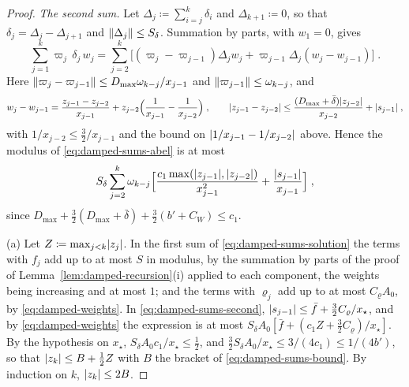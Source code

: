 \documentclass[11pt]{preprint}
\DeclarePairedDelimiter{\abs}{\lvert}{\rvert}
\DeclarePairedDelimiter{\norm}{\lVert}{\rVert}
\numberwithin{equation}{section}
\theoremstyle{definition}
\theoremstyle{remark}
\theoremstyle{plain}
\begin{document}
\begin{proof}
\emph{The second sum.} Let $\Delta_j \coloneqq \sum_{i=j}^{k}\delta_i$ and $\Delta_{k+1} \coloneqq 0$, so that $\delta_j = \Delta_j - \Delta_{j+1}$ and $\norm{\Delta_j} \leq S_\delta$. Summation by parts, with $w_1 = 0$, gives
\begin{equation}\label{eq:damped-sums-abel}
    \sum_{j=1}^{k}\varpi_j\,\delta_j\,w_j = \sum_{j=2}^{k}\bigl[(\varpi_j - \varpi_{j-1})\Delta_jw_j + \varpi_{j-1}\Delta_j(w_j - w_{j-1})\bigr]\;.
\end{equation}
Here $\norm{\varpi_j - \varpi_{j-1}} \leq D_{\max}\omega_{k-j}/x_{j-1}$ and $\norm{\varpi_{j-1}} \leq \omega_{k-j}$, and
\begin{equation}\label{eq:damped-sums-increment}
    w_j - w_{j-1} = \frac{z_{j-1} - z_{j-2}}{x_{j-1}} + z_{j-2}\Bigl(\frac{1}{x_{j-1}} - \frac{1}{x_{j-2}}\Bigr)\;,
    \qquad
    \abs{z_{j-1} - z_{j-2}} \leq \frac{(D_{\max} + \bar\delta)\abs{z_{j-2}}}{x_{j-2}} + \abs{s_{j-1}}\;,
\end{equation}
with $1/x_{j-2} \leq \frac32/x_{j-1}$ and the bound on $\abs{1/x_{j-1} - 1/x_{j-2}}$ above. Hence the modulus of \eqref{eq:damped-sums-abel} is at most
\begin{equation}\label{eq:damped-sums-second}
    S_\delta\sum_{j=2}^{k}\omega_{k-j}\Bigl[\frac{c_1\max(\abs{z_{j-1}}, \abs{z_{j-2}})}{x_{j-1}^2} + \frac{\abs{s_{j-1}}}{x_{j-1}}\Bigr]\;,
\end{equation}
since $D_{\max} + \frac32(D_{\max} + \bar\delta) + \frac32(b' + C_W) \leq c_1$.

(a) Let $Z \coloneqq \max_{j<k}\abs{z_j}$. In the first sum of \eqref{eq:damped-sums-solution} the terms with $f_j$ add up to at most $S$ in modulus, by the summation by parts of the proof of Lemma~\ref{lem:damped-recursion}(i) applied to each component, the weights being increasing and at most $1$; and the terms with $\varrho_j$ add up to at most $C_\varrho A_0$, by \eqref{eq:damped-weights}. In \eqref{eq:damped-sums-second}, $\abs{s_{j-1}} \leq \bar f + \frac32C_\varrho/x_\star$, and by \eqref{eq:damped-weights} the expression is at most $S_\delta A_0[\bar f + (c_1Z + \frac32C_\varrho)/x_\star]$. By the hypothesis on $x_\star$, $S_\delta A_0c_1/x_\star \leq \frac12$, and $\frac32S_\delta A_0/x_\star \leq 3/(4c_1) \leq 1/(4b')$, so that $\abs{z_k} \leq B + \frac12Z$ with $B$ the bracket of \eqref{eq:damped-sums-bound}. By induction on $k$, $\abs{z_k} \leq 2B$.


\end{proof}
\end{document}
